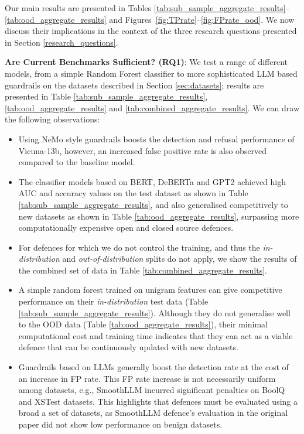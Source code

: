 

Our main results are presented in Tables \ref{tab:sub_sample_aggregate_results}--\ref{tab:ood_aggregate_results} and Figures~\ref{fig:TPrate}--\ref{fig:FPrate_ood}. We now discuss their implications in the context of the three research questions presented in Section \ref{research_questions}.

\textbf{Are Current Benchmarks Sufficient? (RQ1)}: We test a range of different models, from a simple Random Forest classifier to more sophisticated LLM based guardrails on the datasets described in Section \ref{sec:datasets}; results are presented in Table \ref{tab:sub_sample_aggregate_results}, \ref{tab:ood_aggregate_results} and \ref{tab:combined_aggregate_results}. We can draw the following observations:

\begin{itemize}[leftmargin=*,noitemsep]
    \item Using NeMo style guardrails boosts the detection and refusal performance of Vicuna-13b, however, an increased false positive rate is also observed compared to the baseline model. 
    \item The classifier models based on BERT, DeBERTa and GPT2 achieved high AUC and accuracy values on the test dataset as shown in Table \ref{tab:sub_sample_aggregate_results}, and also generalised competitively to new datasets as shown in Table \ref{tab:ood_aggregate_results}, surpassing more computationally expensive open and closed source defences.
    \item For defences for which we do not control the training, and thus the \emph{in-distribution} and \emph{out-of-distribution} splits do not apply, we show the results of the combined set of data in Table \ref{tab:combined_aggregate_results}.
    \item  A simple random forest trained on unigram features can give competitive performance on their \emph{in-distribution} test data (Table \ref{tab:sub_sample_aggregate_results}). Although they do not generalise well to the OOD data (Table \ref{tab:ood_aggregate_results}), their minimal computational cost and training time indicates that they can act as a viable defence that can be continuously updated with new datasets.
    \item Guardrails based on LLMs generally boost the detection rate at the cost of an increase in FP rate. This FP rate increase is not necessarily uniform among datasets, e.g., SmoothLLM incurred significant penalties on BoolQ and XSTest datasets. This highlights that defences must be evaluated using a broad a set of datasets, as SmoothLLM defence's evaluation in the original paper did not show low performance on benign datasets.
\end{itemize}

